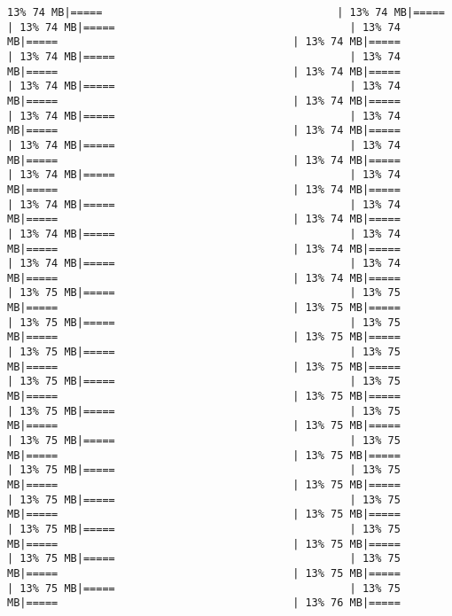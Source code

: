 \documentclass[
]{article}
\begin{document}
\begin{verbatim}
13% 74 MB|=====                                     | 13% 74 MB|=====                                     | 13% 74 MB|=====                                     | 13% 74 MB|=====                                     | 13% 74 MB|=====                                     | 13% 74 MB|=====                                     | 13% 74 MB|=====                                     | 13% 74 MB|=====                                     | 13% 74 MB|=====                                     | 13% 74 MB|=====                                     | 13% 74 MB|=====                                     | 13% 74 MB|=====                                     | 13% 74 MB|=====                                     | 13% 74 MB|=====                                     | 13% 74 MB|=====                                     | 13% 74 MB|=====                                     | 13% 74 MB|=====                                     | 13% 74 MB|=====                                     | 13% 74 MB|=====                                     | 13% 74 MB|=====                                     | 13% 74 MB|=====                                     | 13% 74 MB|=====                                     | 13% 74 MB|=====                                     | 13% 74 MB|=====                                     | 13% 74 MB|=====                                     | 13% 74 MB|=====                                     | 13% 74 MB|=====                                     | 13% 74 MB|=====                                     | 13% 74 MB|=====                                     | 13% 75 MB|=====                                     | 13% 75 MB|=====                                     | 13% 75 MB|=====                                     | 13% 75 MB|=====                                     | 13% 75 MB|=====                                     | 13% 75 MB|=====                                     | 13% 75 MB|=====                                     | 13% 75 MB|=====                                     | 13% 75 MB|=====                                     | 13% 75 MB|=====                                     | 13% 75 MB|=====                                     | 13% 75 MB|=====                                     | 13% 75 MB|=====                                     | 13% 75 MB|=====                                     | 13% 75 MB|=====                                     | 13% 75 MB|=====                                     | 13% 75 MB|=====                                     | 13% 75 MB|=====                                     | 13% 75 MB|=====                                     | 13% 75 MB|=====                                     | 13% 75 MB|=====                                     | 13% 75 MB|=====                                     | 13% 75 MB|=====                                     | 13% 75 MB|=====                                     | 13% 75 MB|=====                                     | 13% 75 MB|=====                                     | 13% 75 MB|=====                                     | 13% 75 MB|=====                                     | 13% 75 MB|=====                                     | 13% 75 MB|=====                                     | 13% 75 MB|=====                                     | 13% 75 MB|=====                                     | 13% 76 MB|=====          
\end{verbatim}
\end{document}
